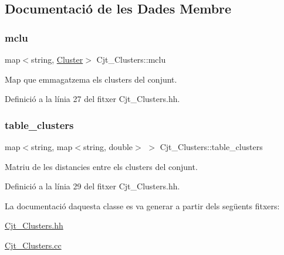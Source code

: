 \subsection{Documentació de les Dades Membre}
\mbox{\label{class_cjt___clusters_a5f5e13255bca1fac2ad65c51473f6ead}} 
\subsubsection{\texorpdfstring{mclu}{mclu}}
{\footnotesize\ttfamily map$<$string, \hyperlink{class_cluster}{Cluster}$>$ Cjt\+\_\+\+Clusters\+::mclu\hspace{0.3cm}{\ttfamily [private]}}



Map que emmagatzema els clusters del conjunt. 



Definició a la línia 27 del fitxer Cjt\+\_\+\+Clusters.\+hh.

\mbox{\label{class_cjt___clusters_a6af3fcf70683cdb88f137f6f51002939}} 
\subsubsection{\texorpdfstring{table\+\_\+clusters}{table\_clusters}}
{\footnotesize\ttfamily map$<$string, map$<$string, double$>$ $>$ Cjt\+\_\+\+Clusters\+::table\+\_\+clusters\hspace{0.3cm}{\ttfamily [private]}}



Matriu de les distancies entre els clusters del conjunt. 



Definició a la línia 29 del fitxer Cjt\+\_\+\+Clusters.\+hh.



La documentació d\textquotesingle{}aquesta classe es va generar a partir dels següents fitxers\+:\begin{DoxyCompactItemize}
\item 
\hyperlink{_cjt___clusters_8hh}{Cjt\+\_\+\+Clusters.\+hh}\item 
\hyperlink{_cjt___clusters_8cc}{Cjt\+\_\+\+Clusters.\+cc}\end{DoxyCompactItemize}
